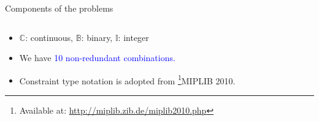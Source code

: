 \documentclass[usenames,dvipsnames]{beamer}
\newcommand{\miplib}{\textsf{MIPLIB 2010}}
\newcommand{\julia}{\texttt{Julia}}
\begin{document}
\begin{frame}{Components of the problems}
\begin{table}[H]
\begin{threeparttable}
\begin{tabular}{@{}lllll@{}}
\end{tabular}
\end{threeparttable}
\end{table}
\vspace{-0.5cm}
\begin{itemize}
\item $\mathbb{C}$: continuous, $\mathbb{B}$: binary, $\mathbb{I}$: integer
\item We have \textcolor{blue}{10 non-redundant combinations.}
\item Constraint type notation is adopted from \footnote{\tiny Available at: \href{http://miplib.zib.de/miplib2010.php}{http://miplib.zib.de/miplib2010.php}}{\miplib}.
\end{itemize}
\end{frame}

\end{document}
